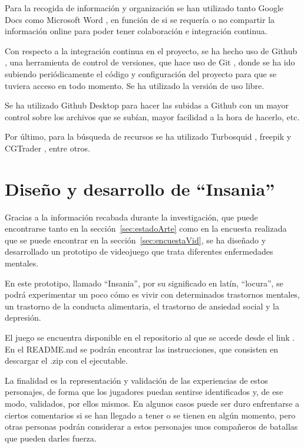 \documentclass[12pt, a4paper,twoside,titlepage]{book}
\begin{document}
Para la recogida de información y organización se han utilizado tanto Google Docs \cite{googledocs} como Microsoft Word \cite{word}, en función de si se requería o no compartir la información online para poder tener colaboración e integración continua.

Con respecto a la integración continua en el proyecto, se ha hecho uso de Github \cite{github}, una herramienta de control de versiones, que hace uso de Git \cite{git}, donde se ha ido subiendo periódicamente el código y configuración del proyecto para que se tuviera acceso en todo momento. Se ha utilizado la versión de uso libre. 

Se ha utilizado Github Desktop  para hacer las subidas a Github con un mayor control sobre los archivos que se subían, mayor facilidad a la hora de hacerlo, etc. 

Por último, para la búsqueda de recursos se ha utilizado Turbosquid , freepik  y CGTrader , entre otros. 


\chapter{Diseño y desarrollo de ``Insania''}
\label{sec:diseñoInsania}
Gracias a la información recabada durante la investigación, que puede encontrarse tanto en la sección~\ref{sec:estadoArte} como en la encuesta realizada que se puede encontrar en la sección~\ref{sec:encuestaVid}, se ha diseñado y desarrollado un prototipo de videojuego que trata diferentes enfermedades mentales. 

En este prototipo, llamado ``Insania'', por su significado en latín, ``locura'', se podrá experimentar un poco cómo es vivir con determinados trastornos mentales, un trastorno de la conducta alimentaria, el trastorno de ansiedad social y la depresión. 

El juego se encuentra disponible en el repositorio al que se accede desde el link . En el README.md se podrán encontrar las instrucciones, que consisten en descargar el .zip con el ejecutable. 

La finalidad es la representación y validación de las experiencias de estos personajes, de forma que los jugadores puedan sentirse identificados y, de ese modo, validados, por ellos mismos. En algunos casos puede ser duro enfrentarse a ciertos comentarios si se han llegado a tener o se tienen en algún momento, pero otras personas podrán considerar a estos personajes unos compañeros de batallas que pueden darles fuerza.
\end{document}
